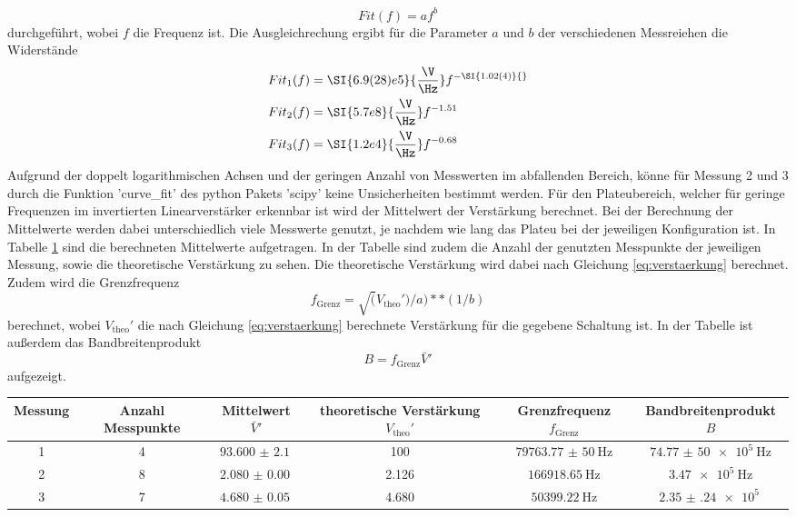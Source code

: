\begin{equation}
    Fit(f) = a f^b
    \label{eq:fit}
\end{equation}
durchgeführt, wobei $f$ die Frequenz ist.
Die Ausgleichrechung ergibt für die Parameter $a$ und $b$ der verschiedenen Messreiehen die Widerstände
\begin{align}
    Fit_1(f) &= \SI{6.9(28)e5}{\frac{\V}{\Hz}} f^{-\SI{1.02(4)}{}} \\
    Fit_2(f) &= \SI{5.7e8}{\frac{\V}{\Hz}} f^{-1.51}\\
    Fit_3(f) &= \SI{1.2e4}{\frac{\V}{\Hz}} f^{-0.68}
\end{align}
Aufgrund der doppelt logarithmischen Achsen und der geringen Anzahl von Messwerten im abfallenden Bereich, könne für Messung 2 und 3 durch die Funktion 'curve\_fit' des python Pakets 'scipy' \cite{scipy} keine Unsicherheiten bestimmt werden.
Für den Plateubereich, welcher für geringe Frequenzen im invertierten Linearverstärker erkennbar ist wird der Mittelwert der Verstärkung berechnet.
Bei der Berechnung der Mittelwerte werden dabei unterschiedlich viele Messwerte genutzt, je nachdem wie lang das Plateu bei der jeweiligen Konfiguration ist.
In Tabelle \ref{tab:inv_lin_mittel} sind die berechneten Mittelwerte aufgetragen. 
In der Tabelle sind zudem die Anzahl der genutzten Messpunkte der jeweiligen Messung, sowie die theoretische Verstärkung zu sehen.
Die theoretische Verstärkung wird dabei nach Gleichung \eqref{eq:verstaerkung} berechnet.
Zudem wird die Grenzfrequenz 
\begin{equation*}
  f_\text{Grenz} = \sqrt(V_\text{theo}')/a)**(1/b)
\end{equation*}
berechnet, wobei $V_\text{theo}'$ die nach Gleichung \eqref{eq:verstaerkung} berechnete Verstärkung für die gegebene Schaltung ist.
In der Tabelle ist außerdem das Bandbreitenprodukt
\begin{equation*}
    B = f_\text{Grenz}\bar{V}'
\end{equation*}
aufgezeigt.
\begin{table}
    \centering
    \begin{tabular}{cccccc}
        \toprule
        Messung & Anzahl Messpunkte & Mittelwert $\bar{V}'$ & theoretische Verstärkung $V_\text{theo}'$ & Grenzfrequenz $f_\text{Grenz}$ & Bandbreitenprodukt $B$\\
        \midrule
        1 & 4 & $\SI{93.600(2100)}{}$ & 100 & $\SI{79763.77(5000)}{\Hz}$ & $\SI{74.77(5000)e5}{\Hz}$\\
        2 & 8 & $\SI{2.080(0)}{} $& 2.126 & $\SI{166918.65}{\Hz} $& $\SI{3.47e5}{\Hz}$\\
        3 & 7 & $\SI{4.680(50)}{} $& 4.680 &$\SI{50399.22}{\Hz}$ & $\SI{2.35(24)e5}{}$\\
        \bottomrule 
    \end{tabular}
    \label{tab:inv_lin_mittel}
\end{table} 
